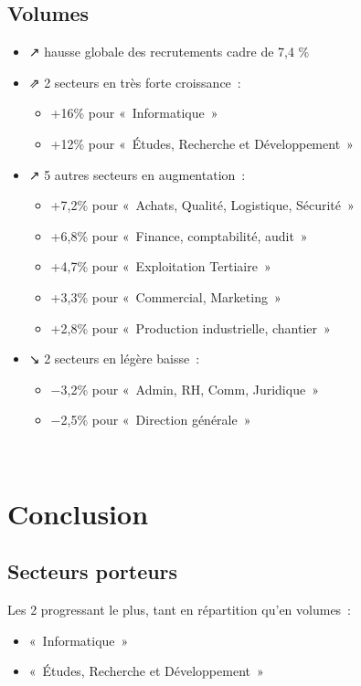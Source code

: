 \documentclass[20pt]{extarticle}
\begin{document}
\subsection{Volumes}
\begin{itemize}
\item{↗ hausse globale des recrutements cadre de 7,4 \%}
\item{⇗ 2 secteurs en très forte croissance :
    \begin{itemize}
    \item{+16\% pour « Informatique »}
    \item{+12\% pour « Études, Recherche et Développement »}
    \end{itemize}}
\item{↗ 5 autres secteurs en augmentation :
    \begin{itemize}
    \item{+7,2\% pour « Achats, Qualité, Logistique, Sécurité »}
    \item{+6,8\% pour « Finance, comptabilité, audit »}
    \item{+4,7\% pour « Exploitation Tertiaire »}
    \item{+3,3\% pour « Commercial, Marketing »}
    \item{+2,8\% pour « Production industrielle, chantier »}
    \end{itemize}}
\item{↘ 2 secteurs en légère baisse :
    \begin{itemize}
    \item{−3,2\% pour « Admin, RH, Comm, Juridique »}
    \item{−2,5\% pour « Direction générale »}
    \end{itemize}}
\end{itemize}
\pagebreak
 
\pagebreak
\section{Conclusion}
\subsection{Secteurs porteurs}
Les 2 progressant le plus, tant en répartition qu’en volumes :
\begin{itemize}
\item{« Informatique »}
\item{« Études, Recherche et Développement »}
\end{itemize}
\end{document}
